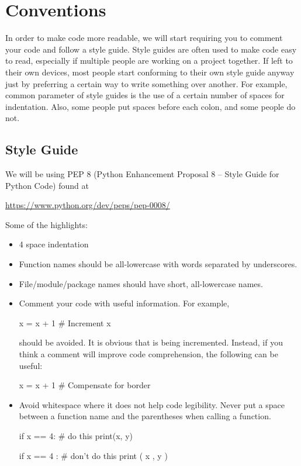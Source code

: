 \documentclass[11pt]{cselabheader}
\begin{document}
\pagebreak
{}
\section{Conventions}
\label{sec:pep8}

In order to make code more readable, we will start requiring you to comment your
code and follow a style guide. Style guides are often used to make code easy to
read, especially if multiple people are working on a project together. If left
to their own devices, most people start conforming to their own style guide
anyway just by preferring a certain way to write something over another. For
example, common parameter of style guides is the use of a certain number of
spaces for indentation. Also, some people put spaces before each colon, and some
people do not.

\subsection{Style Guide}

We will be using PEP 8 (Python Enhancement Proposal 8 -- Style Guide for Python
Code) found at
\begin{center}
  \url{https://www.python.org/dev/peps/pep-0008/}
\end{center}

Some of the highlights:
\begin{itemize}
  \item 4 space indentation
  \item Function names should be all-lowercase with words separated by underscores.
  \item File/module/package names should have short, all-lowercase names.
  \item Comment your code with useful information. For example,

    \begin{python3code}
x = x + 1 # Increment x
    \end{python3code}

    should be avoided. It is obvious that  is being incremented.
    Instead, if you think a comment will improve code comprehension, the
    following can be useful:

    \begin{python3code}
x = x + 1 # Compensate for border
    \end{python3code}

  \item Avoid whitespace where it does not help code legibility. Never put a
    space between a function name and the parentheses when calling a function.

    \begin{python3code}
if x == 4: # do this
    print(x, y)

if x == 4 : # don't do this
    print ( x , y )
    \end{python3code}
\end{itemize}
\end{document}
